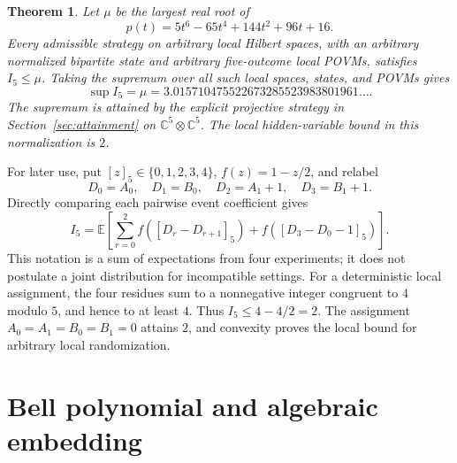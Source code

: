 \documentclass[11pt,a4paper]{article}
\numberwithin{equation}{section}
\newtheorem{theorem}{Theorem}
\theoremstyle{remark}\newtheorem{remark}[theorem]{Remark}
\newcommand{\C}{\mathbb C}
\begin{document}
\begin{theorem}\label{thm:main}
Let $\mu$ be the largest real root of
\begin{equation}\label{eq:sextic}
 p(t)=5t^6-65t^4+144t^2+96t+16.
\end{equation}
Every admissible strategy on arbitrary local Hilbert spaces, with an
arbitrary normalized bipartite state and arbitrary five-outcome local POVMs,
satisfies $I_5\leq\mu$. Taking the supremum over all such local spaces,
states, and POVMs gives
\begin{equation}\label{eq:maximum}
 \sup I_5=\mu=3.015710475522673285523983801961\ldots.
\end{equation}
The supremum is attained by the explicit projective strategy in
Section~\ref{sec:attainment} on $\C^5\otimes\C^5$. The local hidden-variable
bound in this normalization is $2$.
\end{theorem}

For later use, put $[z]_5\in\{0,1,2,3,4\}$, $f(z)=1-z/2$, and relabel
\begin{equation}\label{eq:relabel}
 D_0=A_0,\quad D_1=B_0,\quad D_2=A_1+1,\quad D_3=B_1+1.
\end{equation}
Directly comparing each pairwise event coefficient gives
\begin{equation}\label{eq:cyclic}
 I_5=\mathbb E\left[
 \sum_{r=0}^{2}f([D_r-D_{r+1}]_5)+f([D_3-D_0-1]_5)\right].
\end{equation}
This notation is a sum of expectations from four experiments; it does not
postulate a joint distribution for incompatible settings. For a deterministic
local assignment, the four residues sum to a nonnegative integer congruent
to $4$ modulo $5$, and hence to at least $4$. Thus $I_5\leq4-4/2=2$.
The assignment $A_0=A_1=B_0=B_1=0$ attains $2$, and convexity proves the
local bound for arbitrary local randomization.

\section{Bell polynomial and algebraic embedding}\label{sec:algebra}
\end{document}
